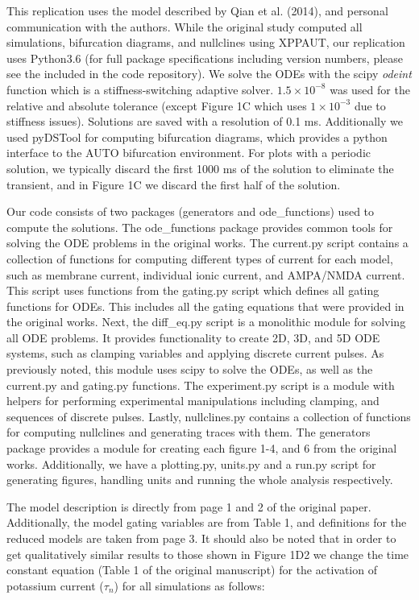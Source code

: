 This replication uses the model described by Qian et al. (2014), and personal communication with the authors. While the original study computed all simulations, bifurcation diagrams, and nullclines using XPPAUT, our replication uses Python3.6 (for full package specifications including version numbers, please see the included  in the code repository). We solve the ODEs with the scipy \emph{odeint} function which is a stiffness-switching adaptive solver. $1.5\times 10^{-8}$ was used for the relative and absolute tolerance (except Figure 1C which uses $1\times 10^{-3}$ due to stiffness issues). Solutions are saved with a resolution of 0.1 ms. Additionally we used pyDSTool \cite{pydstool} for computing bifurcation diagrams, which provides a python interface to the AUTO bifurcation environment. For plots with a periodic solution, we typically discard the first 1000 ms of the solution to eliminate the transient, and in Figure 1C we discard the first half of the solution. 

Our code consists of two packages (generators and ode\_functions) used to compute the solutions. The ode\_functions package provides common tools for solving the ODE problems in the original works. The current.py script contains a collection of functions for computing different types of current for each model, such as membrane current, individual ionic current, and AMPA/NMDA current. This script uses functions from the gating.py script which defines all gating functions for ODEs. This includes all the gating equations that were provided in the original works. Next, the diff\_eq.py script is a monolithic module for solving all ODE problems. It provides functionality to create 2D, 3D, and 5D ODE systems, such as clamping variables and applying discrete current pulses. As previously noted, this module uses scipy to solve the ODEs, as well as the current.py and gating.py functions. The experiment.py script is a module with helpers for performing experimental manipulations including clamping, and sequences of discrete pulses. Lastly, nullclines.py contains a collection of functions for computing nullclines and generating traces with them.
The generators package provides a module for creating each figure 1-4, and 6 from the original works. Additionally, we have a plotting.py, units.py and a run.py script for generating figures, handling units and running the whole analysis respectively. 

The model description is directly from page 1 and 2 of the original paper. Additionally, the model gating variables are from Table 1, and definitions for the reduced models are taken from page 3. It should also be noted that in order to get qualitatively similar results to those shown in Figure 1D2 we change the time constant equation (Table 1 of the original manuscript) for the activation of potassium current ($\tau_n$) for all simulations as follows:

